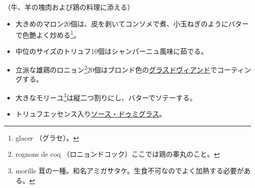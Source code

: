 \begin{recette}
（牛、羊の塊肉および鶏の料理に添える）

\begin{itemize}
\item
  大きめのマロン20個は、皮を剥いてコンソメで煮、小玉ねぎのようにバターで色艶よく炒める\footnote{glacer
    （グラセ）。}。
\item
  中位のサイズのトリュフ10個はシャンパーニュ風味に茹でる。
\item
  立派な雄鶏のロニョン\footnote{rognons de coq
    （ロニョンドコック）ここでは鶏の睾丸のこと。}20個はブロンド色の\protect\hyperlink{glace-de-viande}{グラスドヴィアンド}でコーティングする。
\item
  大きなモリーユ\footnote{morille
    茸の一種。和名アミガサタケ。生食不可なのでよく加熱する必要がある。}は縦二つ割りにし、バターでソテーする。
\item
  トリュフエッセンス入り\protect\hyperlink{sauce-demi-glace}{ソース・ドゥミグラス}。
\end{itemize}

\hypertarget{garniture-godard}{%
}
\end{recette}
